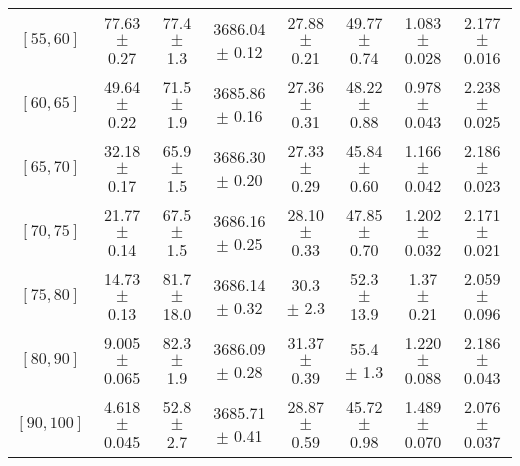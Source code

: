 \begin{tabular}{c||c|c|c|c|c|c|c}
$[55, 60]$ & 77.63 $\pm$ 0.27 & 77.4 $\pm$ 1.3 & 3686.04 $\pm$ 0.12 & 27.88 $\pm$ 0.21 & 49.77 $\pm$ 0.74 & 1.083 $\pm$ 0.028 & 2.177 $\pm$ 0.016\\
$[60, 65]$ & 49.64 $\pm$ 0.22 & 71.5 $\pm$ 1.9 & 3685.86 $\pm$ 0.16 & 27.36 $\pm$ 0.31 & 48.22 $\pm$ 0.88 & 0.978 $\pm$ 0.043 & 2.238 $\pm$ 0.025\\
$[65, 70]$ & 32.18 $\pm$ 0.17 & 65.9 $\pm$ 1.5 & 3686.30 $\pm$ 0.20 & 27.33 $\pm$ 0.29 & 45.84 $\pm$ 0.60 & 1.166 $\pm$ 0.042 & 2.186 $\pm$ 0.023\\
$[70, 75]$ & 21.77 $\pm$ 0.14 & 67.5 $\pm$ 1.5 & 3686.16 $\pm$ 0.25 & 28.10 $\pm$ 0.33 & 47.85 $\pm$ 0.70 & 1.202 $\pm$ 0.032 & 2.171 $\pm$ 0.021\\
$[75, 80]$ & 14.73 $\pm$ 0.13 & 81.7 $\pm$ 18.0 & 3686.14 $\pm$ 0.32 & 30.3 $\pm$ 2.3 & 52.3 $\pm$ 13.9 & 1.37 $\pm$ 0.21 & 2.059 $\pm$ 0.096\\
$[80, 90]$ & 9.005 $\pm$ 0.065 & 82.3 $\pm$ 1.9 & 3686.09 $\pm$ 0.28 & 31.37 $\pm$ 0.39 & 55.4 $\pm$ 1.3 & 1.220 $\pm$ 0.088 & 2.186 $\pm$ 0.043\\
$[90, 100]$ & 4.618 $\pm$ 0.045 & 52.8 $\pm$ 2.7 & 3685.71 $\pm$ 0.41 & 28.87 $\pm$ 0.59 & 45.72 $\pm$ 0.98 & 1.489 $\pm$ 0.070 & 2.076 $\pm$ 0.037\\
\end{tabular}
